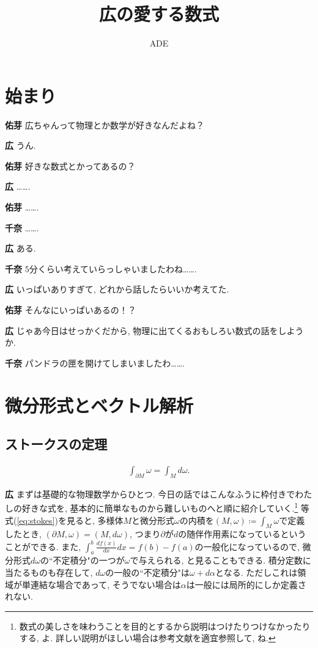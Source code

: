 \documentclass{ltjsarticle}
\title{広の愛する数式}
\author{ADE}
\date{}
\theoremstyle{definition}
\newcommand{\parno}{\par\noindent}
\begin{document}
\maketitle

\newpage
\tableofcontents
\newpage

\section{始まり}
\noindent
\textbf{佑芽} 広ちゃんって物理とか数学が好きなんだよね？\parno
\textbf{広} うん.\parno
\textbf{佑芽} 好きな数式とかってあるの？\parno
\textbf{広} …….\parno
\textbf{佑芽} …….\parno
\textbf{千奈} …….\parno
\textbf{広} ある.\parno
\textbf{千奈} 5分くらい考えていらっしゃいましたわね…….\parno
\textbf{広} いっぱいありすぎて, どれから話したらいいか考えてた.\parno
\textbf{佑芽} そんなにいっぱいあるの！？\parno
\textbf{広} じゃあ今日はせっかくだから, 物理に出てくるおもしろい数式の話をしようか.\parno
\textbf{千奈} パンドラの匣を開けてしまいましたわ…….


\section{微分形式とベクトル解析}

\subsection{ストークスの定理}
\begin{tcolorbox}
\begin{align}
\int_{\partial M}\omega=\int_Md\omega.\label{eq:stokes}
\end{align}
\end{tcolorbox}
\parno
\textbf{広} まずは基礎的な物理数学からひとつ. 今日の話ではこんなふうに枠付きでわたしの好きな式を, 基本的に簡単なものから難しいものへと順に紹介していく.\footnote{数式の美しさを味わうことを目的とするから説明はつけたりつけなかったりする, よ. 詳しい説明がほしい場合は参考文献を適宜参照して, ね.} 等式(\ref{eq:stokes})を見ると, 多様体$M$と微分形式$\omega$の内積を$(M,\omega)\coloneqq\displaystyle\int_M\omega$で定義したとき, $(\partial M,\omega)=(M,d\omega)$, つまり$\partial$が$d$の随伴作用素になっているということができる. また, $\displaystyle\int_a^b\frac{df(x)}{dx}dx=f(b)-f(a)$の一般化になっているので, 微分形式$d\omega$の``不定積分"の一つが$\omega$で与えられる, と見ることもできる. 積分定数に当たるものも存在して, $d\omega$の一般の``不定積分"は$\omega+d\alpha$となる. ただしこれは領域が単連結な場合であって, そうでない場合は$\alpha$は一般には局所的にしか定義されない.
\end{document}
